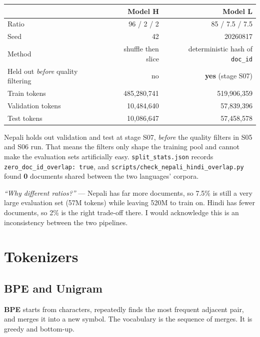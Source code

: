 \documentclass[11pt]{report}
\begin{document}
\begin{center}\small
\begin{tabular}{lrr}
\toprule
& \textbf{Model H} & \textbf{Model L} \\
\midrule
Ratio & 96 / 2 / 2 & 85 / 7.5 / 7.5 \\
Seed & 42 & 20260817 \\
Method & shuffle then slice & deterministic hash of \texttt{doc\_id} \\
Held out \emph{before} quality filtering & no & \textbf{yes} (stage S07) \\
Train tokens & 485,280,741 & 519,906,359 \\
Validation tokens & 10,484,640 & 57,839,396 \\
Test tokens & 10,086,647 & 57,458,578 \\
\bottomrule
\end{tabular}
\end{center}

\begin{deeper}
Nepali holds out validation and test at stage S07, \emph{before} the quality
filters in S05 and S06 run. That means the filters only shape the training pool
and cannot make the evaluation sets artificially easy.
\texttt{split\_stats.json} records \texttt{zero\_doc\_id\_overlap: true}, and
\texttt{scripts/check\_nepali\_hindi\_overlap.py} found \textbf{0} documents
shared between the two languages' corpora.
\end{deeper}

\begin{notebox}
\textit{``Why different ratios?''} --- Nepali has far more documents, so 7.5\%
is still a very large evaluation set (57M tokens) while leaving 520M to train
on. Hindi has fewer documents, so 2\% is the right trade-off there. I would
acknowledge this is an inconsistency between the two pipelines.
\end{notebox}

\section{Tokenizers}

\subsection{BPE and Unigram}

\textbf{BPE} starts from characters, repeatedly finds the most frequent
adjacent pair, and merges it into a new symbol. The vocabulary is the sequence
of merges. It is greedy and bottom-up.
\end{document}
